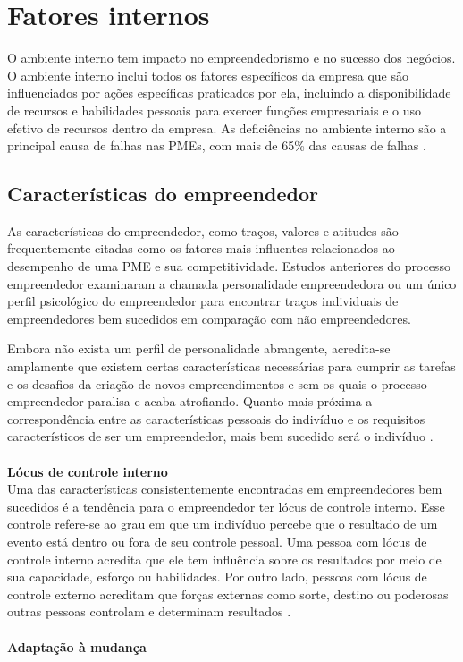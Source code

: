 \section{Fatores internos}
\label{sec:temp}

O ambiente interno tem impacto no empreendedorismo e no sucesso dos negócios. O ambiente interno inclui todos os fatores específicos da empresa que são influenciados por ações específicas praticados por ela, incluindo a disponibilidade de recursos e habilidades pessoais para exercer funções empresariais e o uso efetivo de recursos dentro da empresa. As deficiências no ambiente interno são a principal causa de falhas nas PMEs, com mais de 65\% das causas de falhas \cite{ligthelma.a.&cantm.c2002}.

\subsection{Características do empreendedor}
\label{subsec:framing}

As características do empreendedor, como traços, valores e atitudes são frequentemente citadas como os fatores mais influentes relacionados ao desempenho de uma PME e sua competitividade. Estudos anteriores do processo empreendedor examinaram a chamada personalidade empreendedora ou um único perfil psicológico do empreendedor para encontrar traços individuais de empreendedores bem sucedidos em comparação com não empreendedores.

Embora não exista um perfil de personalidade abrangente, acredita-se amplamente que existem certas características necessárias para cumprir as tarefas e os desafios da criação de novos empreendimentos e sem os quais o processo empreendedor paralisa e acaba atrofiando. Quanto mais próxima a correspondência entre as características pessoais do indivíduo e os requisitos característicos de ser um empreendedor, mais bem sucedido será o indivíduo \cite{thandekaruthkunene2008}.
\\
\\
\textbf{Lócus de controle interno}
\\

Uma das características consistentemente encontradas em empreendedores bem sucedidos é a tendência para o empreendedor ter lócus de controle interno. Esse controle refere-se ao grau em que um indivíduo percebe que o resultado de um evento está dentro ou fora de seu controle pessoal. Uma pessoa com lócus de controle interno acredita que ele tem influência sobre os resultados por meio de sua capacidade, esforço ou habilidades. Por outro lado, pessoas com lócus de controle externo acreditam que forças externas como sorte, destino ou poderosas outras pessoas controlam e determinam resultados \cite{stephenl.muelleranisyas.thomas2001}.
\\
\\
\textbf{Adaptação à mudança}
\\

